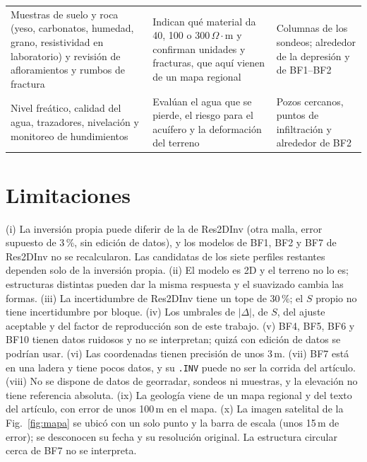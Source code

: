 \documentclass[conference]{IEEEtran}
\newcommand{\ohmm}{\ensuremath{\Omega\!\cdot\!\mathrm{m}}}
\begin{document}
\begin{table}[!t]
\begin{tabular}{p{}p{}p{}}
Muestras de suelo y roca (yeso, carbonatos, humedad, grano, resistividad en laboratorio) y revisi\'on de afloramientos y rumbos de fractura & Indican qu\'e material da 40, 100 o 300\,\ohmm{} y confirman unidades y fracturas, que aqu\'i vienen de un mapa regional & Columnas de los sondeos; alrededor de la depresi\'on y de BF1--BF2 \\
Nivel fre\'atico, calidad del agua, trazadores, nivelaci\'on y monitoreo de hundimientos & Eval\'uan el agua que se pierde, el riesgo para el acu\'ifero y la deformaci\'on del terreno & Pozos cercanos, puntos de infiltraci\'on y alrededor de BF2 \\
\bottomrule
\end{tabular}
\end{table}

\section{Limitaciones}
(i) La inversi\'on propia puede diferir de la de Res2DInv (otra malla, error supuesto de 3\,\%, sin edici\'on de datos), y los modelos de BF1, BF2 y BF7 de Res2DInv no se recalcularon. Las candidatas de los siete perfiles restantes dependen solo de la inversi\'on propia. (ii) El modelo es 2D y el terreno no lo es; estructuras distintas pueden dar la misma respuesta y el suavizado cambia las formas. (iii) La incertidumbre de Res2DInv tiene un tope de 30\,\%; el $S$ propio no tiene incertidumbre por bloque. (iv) Los umbrales de $|\Delta|$, de $S$, del ajuste aceptable y del factor de reproducci\'on son de este trabajo. (v) BF4, BF5, BF6 y BF10 tienen datos ruidosos y no se interpretan; quiz\'a con edici\'on de datos se podr\'ian usar. (vi) Las coordenadas tienen precisi\'on de unos 3\,m. (vii) BF7 est\'a en una ladera y tiene pocos datos, y su \texttt{.INV} puede no ser la corrida del art\'iculo. (viii) No se dispone de datos de georradar, sondeos ni muestras, y la elevaci\'on no tiene referencia absoluta. (ix) La geolog\'ia viene de un mapa regional y del texto del art\'iculo, con error de unos 100\,m en el mapa. (x) La imagen satelital de la Fig.~\ref{fig:mapa} se ubic\'o con un solo punto y la barra de escala (unos 15\,m de error); se desconocen su fecha y su resoluci\'on original. La estructura circular cerca de BF7 no se interpreta.
\end{document}
